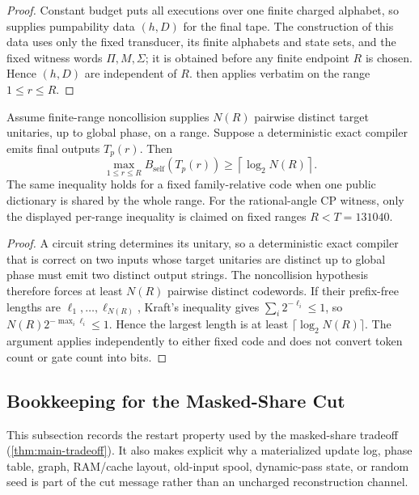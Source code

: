 \begin{proof}
Constant budget puts all executions over one finite charged alphabet, so
 supplies pumpability data $(h,D)$ for the
final tape. The construction of this data uses only the fixed transducer, its
finite alphabets and state sets, and the fixed witness words $\Pi,M,\Sigma$;
it is obtained before any finite endpoint $R$ is chosen. Hence $(h,D)$ are
independent of $R$.  then applies verbatim on
the range $1\le r\le R$.
\end{proof}

\begin{corollary}
\label{app:cor:counting-toll}
Assume finite-range noncollision supplies $N(R)$ pairwise distinct target
unitaries, up to global phase, on a range. Suppose a deterministic exact
compiler emits final outputs $T_p(r)$. Then
\[
  \max_{1\le r\le R}B_{\mathrm{self}}(T_p(r))
  \ge \left\lceil\log_2 N(R)\right\rceil.
\]
The same inequality holds for a fixed family-relative code when one public
dictionary is shared by the whole range.  For the rational-angle CP witness,
only the displayed per-range inequality is claimed on fixed ranges
$R<T=131040$.
\end{corollary}

\begin{proof}
A circuit string determines its unitary, so a deterministic exact compiler
that is correct on two inputs whose target unitaries are distinct up to global
phase must emit two distinct output strings. The noncollision hypothesis
therefore forces at least $N(R)$ pairwise distinct codewords.  If their
prefix-free lengths are $\ell_1,\ldots,\ell_{N(R)}$, Kraft's inequality
gives $\sum_i2^{-\ell_i}\leq1$, so
$N(R)2^{-\max_i\ell_i}\leq1$.  Hence the largest length is at least
$\lceil\log_2N(R)\rceil$.  The argument applies independently to either
fixed code and does not convert token count or gate count into bits.
\end{proof}

\subsection{Bookkeeping for the Masked-Share Cut}
\label{app:sec:streaming-proof}

This subsection records the restart property used by the masked-share
tradeoff (\cref{thm:main-tradeoff}).  It also makes explicit why a
materialized update log, phase table, graph, RAM/cache layout, old-input
spool, dynamic-pass state, or random seed is part of the cut message rather
than an uncharged reconstruction channel.

